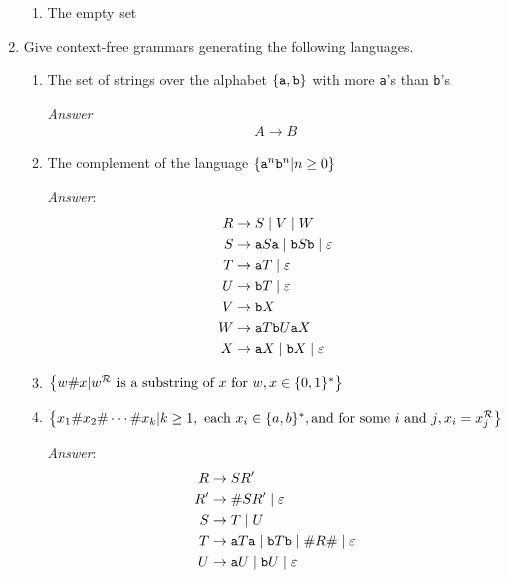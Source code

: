 \begin{enumerate}[font=\bfseries,label=2.\arabic*]
\begin{enumerate}[font=\bfseries,label=\alph*.]
    \item The empty set
\end{enumerate}


\item Give context-free grammars generating the following languages.

\begin{enumerate}[font=\bfseries,label=\alph*.]
    \item The set of strings over the alphabet $\{{\tt a},{\tt b}\}$ with more {\tt a}’s than {\tt b}’s
    
    \emph{Answer}
    \begin{align*}
        A\rightarrow B
    \end{align*}
    
    \item The complement of the language $\{{\tt a}^n {\tt b}^n | n \ge 0\}$
    
    \emph{Answer}:
    \begin{equation*}
    \begin{split}
        R &\rightarrow S \mid V \mid W \\
        S &\rightarrow {\tt a}S{\tt a} \mid {\tt b}S{\tt b} \mid \varepsilon \\
        T &\rightarrow {\tt a}T \mid \varepsilon \\
        U &\rightarrow {\tt b}T \mid \varepsilon \\
        V &\rightarrow {\tt b}X \\
        W &\rightarrow {\tt a}T{\tt b}U{\tt a}X \\
        X &\rightarrow {\tt a}X \mid {\tt b}X \mid \varepsilon
    \end{split}
    \end{equation*}
    
    \item $\left\{w{\tt \#}x| w^\mathcal R \text{ is a substring of $x$ for } w, x\in \{0,1\}^\ast \right\}$
    
    \item $\left\{x_1{\tt \#}x_2{\tt \#}\cdots{\tt \#}x_k | k\ge 1, \text{ each } x_i \in \{a, b\}^\ast , \text{and for some $i$ and $j$}, x_i = x_j^\mathcal R \right\}$
    
    \emph{Answer}:
    \begin{equation*}
    \begin{split}
        R &\rightarrow SR' \\
        R'&\rightarrow {\tt \#}SR' \mid \varepsilon \\
        S &\rightarrow T \mid U \\
        T &\rightarrow {\tt a}T{\tt a} \mid {\tt b}T{\tt b} \mid {\tt \#}R{\tt \#} \mid \varepsilon \\
        U &\rightarrow {\tt a}U \mid {\tt b}U \mid \varepsilon
    \end{split}
    \end{equation*}
    

\end{enumerate}
\end{enumerate}
